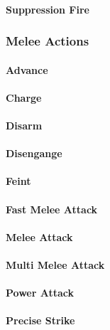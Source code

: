 \paragraph{Suppression Fire}

\subsubsection{Melee Actions}

\paragraph{Advance}

\paragraph{Charge}

\paragraph{Disarm}

\paragraph{Disengange}

\paragraph{Feint}

\paragraph{Fast Melee Attack}

\paragraph{Melee Attack}

\paragraph{Multi Melee Attack}

\paragraph{Power Attack}

\paragraph{Precise Strike}

